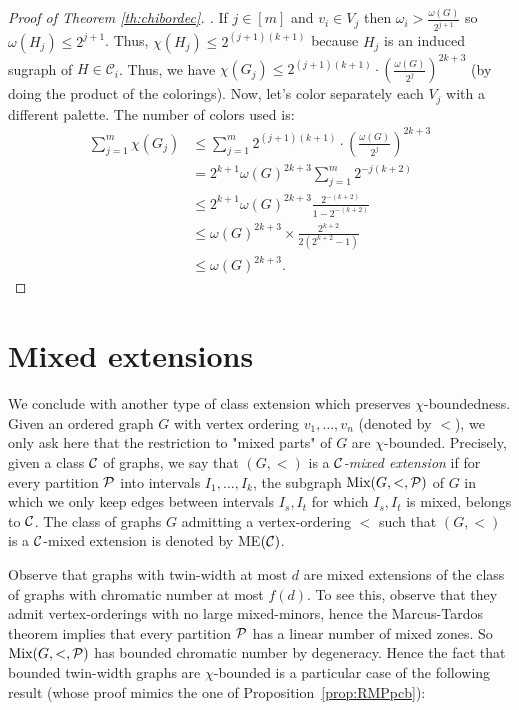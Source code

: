 \documentclass[11pt]{article}
\numberwithin{equation}{section}
\begin{document}
\begin{proof}[Proof of Theorem \ref{th:chibordec}. ]
If $j \in [m]$ and $v_i \in V_j$ then $\omega_i > \frac{\omega(G)}{2^{j+1}}$ so $\omega(H_j) \leq 2^{j+1}$. Thus, $\chi(H_j) \leq 2^{(j+1)(k+1)}$ because $H_j$ is an induced sugraph of $H\in \mathcal{C}_i$. Thus, we have $\chi(G_j) \leq 2^{(j+1)(k+1)} \cdot \left(\frac{\omega(G)}{2^{j}}\right)^{2k+3}$ (by doing the product of the colorings). Now, let's color separately each $V_j$ with a different palette. The number of colors used is: \begin{align*}
    \sum_{j=1}^m \chi(G_j) &\leq \sum_{j = 1}^m 2^{(j+1)(k+1)} \cdot \left(\frac{\omega(G)}{2^{j}}\right)^{2k+3} \\
                            &= 2^{k+1} \omega(G)^{2k+3} \sum_{j = 1}^m 2^{-j(k+2)} \\
                            &\leq 2^{k+1} \omega(G)^{2k+3} \frac{2^{-(k+2)}}{1-2^{-(k+2)}} \\
                            &\leq \omega(G)^{2k+3} \times \frac{2^{k+2}}{2(2^{k+2} - 1)} \\
                            &\leq \omega(G)^{2k+3}.
\end{align*}
\end{proof}
\section{Mixed extensions}

We conclude with another type of class extension which preserves  $\chi$-boundedness. Given an ordered graph $G$ with vertex ordering  $v_1,\dots ,v_n$ (denoted by $<$), we only ask here that the restriction to "mixed parts" of $G$ are $\chi$-bounded. Precisely, given a class $\cal C$ of graphs, we say that $(G,<)$ is a \emph{$\cal C$-mixed extension} if for every partition $\cal P$ into intervals $I_1,\dots ,I_k$, the subgraph $\text{Mix}(G,<,\cal P)$ of $G$ in which we only keep edges between intervals $I_s,I_t$ for which $I_s,I_t$ is mixed, belongs to $\cal C$. The class of graphs $G$ admitting a vertex-ordering $<$ such that $(G,<)$ is a $\cal C$-mixed extension is denoted by ME$(\cal C)$.

Observe that graphs with twin-width at most $d$ are mixed extensions of the class of graphs with chromatic number at most $f(d)$. To see this, observe that they admit vertex-orderings with no large mixed-minors, hence the Marcus-Tardos theorem implies that every partition $\cal P$ has a linear number of mixed zones. So $\text{Mix}(G,<,\cal P)$ has bounded chromatic number by degeneracy. Hence the fact that bounded twin-width graphs are $\chi$-bounded is a particular case of the following result (whose proof mimics the one of Proposition~\ref{prop:RMPpcb}):
\end{document}

